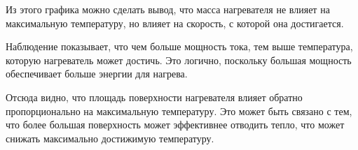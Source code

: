 	Из этого графика можно сделать вывод, что масса нагревателя не влияет на максимальную температуру, но влияет на скорость, с которой она достигается.

	Наблюдение показывает, что чем больше мощность тока, тем выше температура, которую нагреватель может достичь. Это логично, поскольку большая мощность обеспечивает больше энергии для нагрева.

	Отсюда видно, что площадь поверхности нагревателя влияет обратно пропорционально на максимальную температуру. Это может быть связано с тем, что более большая поверхность может эффективнее отводить тепло, что может снижать максимально достижимую температуру.


\pagebreak